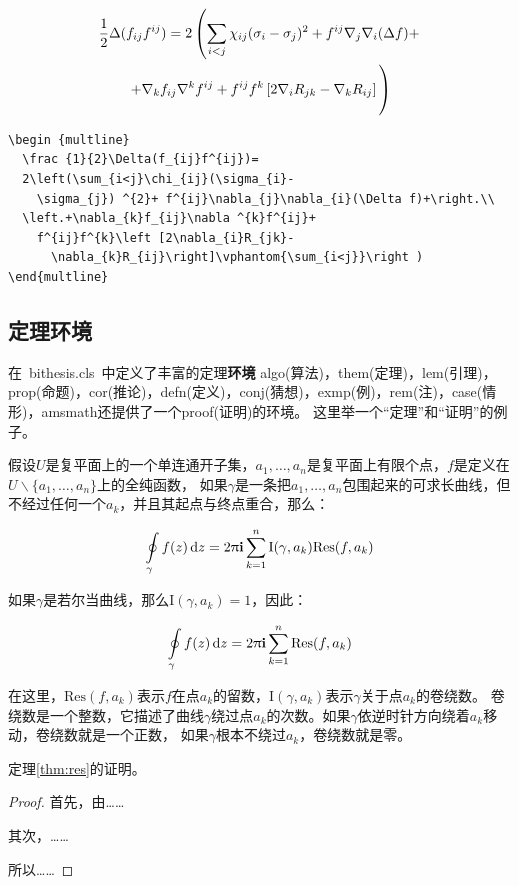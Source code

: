 \begin {multline}
  \frac {1}{2}\Delta (f_{ij}f^{ij})=
  2\left (\sum _{i<j}\chi _{ij}(\sigma _{i}-
    \sigma _{j}) ^{2}+ f^{ij}\nabla _{j}\nabla _{i}(\Delta f)+\right .\\
  \left .+\nabla _{k}f_{ij}\nabla ^{k}f^{ij}+
    f^{ij}f^{k}\left [2\nabla _{i}R_{jk}-
      \nabla _{k}R_{ij}\right ]\vphantom {\sum _{i<j}}\right )
\end{multline}

\begin{lstlisting}[language={[LaTeX]TeX}, caption={长公式排版}]
\begin {multline}
  \frac {1}{2}\Delta(f_{ij}f^{ij})=
  2\left(\sum_{i<j}\chi_{ij}(\sigma_{i}-
    \sigma_{j}) ^{2}+ f^{ij}\nabla_{j}\nabla_{i}(\Delta f)+\right.\\
  \left.+\nabla_{k}f_{ij}\nabla ^{k}f^{ij}+
    f^{ij}f^{k}\left [2\nabla_{i}R_{jk}-
      \nabla_{k}R_{ij}\right]\vphantom{\sum_{i<j}}\right )
\end{multline}
\end{lstlisting}

\subsection{定理环境}

在~bithesis.cls~中定义了丰富的定理\textbf{环境}
algo(算法)，them(定理)，lem(引理)，prop(命题)，cor(推论)，defn(定义)，conj(猜想)，exmp(例)，rem(注)，case(情形)，amsmath还提供了一个proof(证明)的环境。
这里举一个``定理''和``证明''的例子。
\begin{them}[留数定理]
\label{thm:res}
  假设$U$是复平面上的一个单连通开子集，$a_1,\ldots,a_n$是复平面上有限个点，$f$是定义在$U\backslash \{a_1,\ldots,a_n\}$上的全纯函数，
  如果$\gamma$是一条把$a_1,\ldots,a_n$包围起来的可求长曲线，但不经过任何一个$a_k$，并且其起点与终点重合，那么：

  \begin{equation}
    \label{eq:res}
    \ointop_{\gamma}f(z)\,\mathrm{d}z = 2\uppi\mathbf{i}\sum^n_{k=1}\mathrm{I}(\gamma,a_k)\mathrm{Res}(f,a_k)
  \end{equation}

  如果$\gamma$是若尔当曲线，那么$\mathrm{I}(\gamma, a_k)=1$，因此：

  \begin{equation}
    \label{eq:resthm}
    \ointop_{\gamma}f(z)\,\mathrm{d}z = 2\uppi\mathbf{i}\sum^n_{k=1}\mathrm{Res}(f,a_k)
  \end{equation}

  在这里，$\mathrm{Res}(f, a_k)$表示$f$在点$a_k$的留数，$\mathrm{I}(\gamma,a_k)$表示$\gamma$关于点$a_k$的卷绕数。
  卷绕数是一个整数，它描述了曲线$\gamma$绕过点$a_k$的次数。如果$\gamma$依逆时针方向绕着$a_k$移动，卷绕数就是一个正数，
  如果$\gamma$根本不绕过$a_k$，卷绕数就是零。

  定理\ref{thm:res}的证明。
  
  \begin{proof}
    首先，由……

    其次，……

    所以……
  \end{proof}
  
\end{them}

